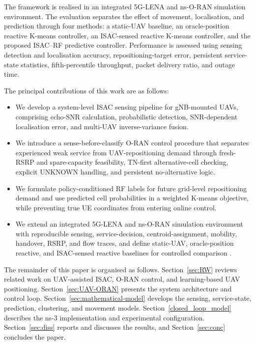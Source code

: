 The framework is realised in an integrated 5G-LENA and ns-O-RAN simulation
environment. The evaluation separates the effect of movement, localisation,
and prediction through four methods: a static-UAV baseline, an
oracle-position reactive K-means controller, an ISAC-sensed reactive K-means
controller, and the proposed ISAC--RF predictive controller. Performance is
assessed using sensing detection and localisation accuracy,
repositioning-target error, persistent service-state statistics,
fifth-percentile throughput, packet delivery ratio, and outage time.

The principal contributions of this work are as follows:
\begin{itemize}
    \item We develop a system-level ISAC sensing pipeline for gNB-mounted UAVs,
    comprising echo-SNR calculation, probabilistic detection, SNR-dependent
    localisation error, and multi-UAV inverse-variance fusion.

    \item We introduce a sense-before-classify O-RAN control procedure that
    separates experienced weak service from UAV-repositioning demand through
    fresh-RSRP and spare-capacity feasibility, TN-first alternative-cell
    checking, explicit UNKNOWN handling, and persistent no-alternative logic.

    \item We formulate policy-conditioned RF labels for future grid-level
    repositioning demand and use predicted cell probabilities in a weighted
    K-means objective, while preventing true UE coordinates from entering
    online control.

    \item We extend an integrated 5G-LENA and ns-O-RAN simulation environment
    with reproducible sensing, service-decision, centroid-assignment, mobility,
    handover, RSRP, and flow traces, and define static-UAV, oracle-position
    reactive, and ISAC-sensed reactive baselines for controlled comparison
    \cite{5glenaNR,garey2023ran}.
\end{itemize}

The remainder of this paper is organised as follows. Section~\ref{sec:RW}
reviews related work on UAV-assisted ISAC, O-RAN control, and learning-based
UAV positioning. Section~\ref{sec:UAV-ORAN} presents the system architecture
and control loop. Section~\ref{sec:mathematical-model} develops the sensing,
service-state, prediction, clustering, and movement models.
Section~\ref{closed_loop_model} describes the ns-3 implementation and
experimental configuration. Section~\ref{sec:diss} reports and discusses the
results, and Section~\ref{sec:conc} concludes the paper.
